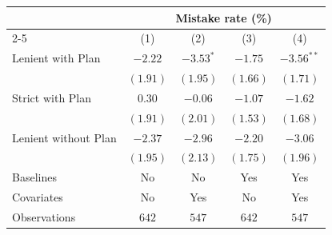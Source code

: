 \begin{tabular}{l c c c c}
\toprule
 & \multicolumn{4}{c}{Mistake rate (\%)} \\
\cmidrule(lr){2-5}
 & (1) & (2) & (3) & (4) \\
\midrule
Lenient with Plan    & $-2.22$  & $-3.53^{*}$ & $-1.75$  & $-3.56^{**}$ \\
                     & $(1.91)$ & $(1.95)$    & $(1.66)$ & $(1.71)$     \\
Strict with Plan     & $0.30$   & $-0.06$     & $-1.07$  & $-1.62$      \\
                     & $(1.91)$ & $(2.01)$    & $(1.53)$ & $(1.68)$     \\
Lenient without Plan & $-2.37$  & $-2.96$     & $-2.20$  & $-3.06$      \\
                     & $(1.95)$ & $(2.13)$    & $(1.75)$ & $(1.96)$     \\
\midrule
Baselines            & No       & No          & Yes      & Yes          \\
Covariates           & No       & Yes         & No       & Yes          \\
Observations            & $642$    & $547$       & $642$    & $547$        \\
\bottomrule
\end{tabular}

